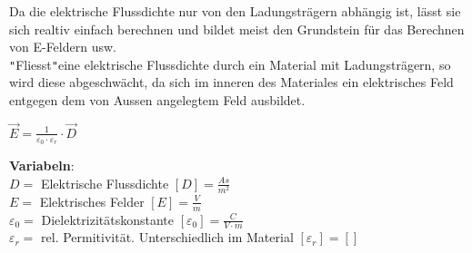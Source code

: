 Da die elektrische Flussdichte nur von den Ladungsträgern abhängig ist, lässt sie sich realtiv einfach berechnen und bildet meist den Grundstein für
das Berechnen von E-Feldern usw. \\
\texttt{"}Fliesst\texttt{"}eine elektrische Flussdichte durch ein Material mit Ladungsträgern, so wird diese abgeschwächt, da sich im inneren des Materiales ein
elektrisches Feld entgegen dem von Aussen angelegtem Feld ausbildet. \\
\begin{center}
\end{center}

\begingl
\begin{center}
	\formulaBegin
	$ \vec{E} = \frac{1}{\varepsilon_0 \cdot \varepsilon_r} \cdot \vec{D}$
	\formulaEnd
\end{center}
\textbf{Variabeln}: \\
$D = $ Elektrische Flussdichte $ [D] = \frac{As}{m^2}$ \\
$ E = $ Elektrisches Felder $[E] = \frac{V}{m}$ \\
$ \varepsilon_0 = $ Dielektrizitätskonstante $ [\varepsilon_0] = \frac{C}{V\cdot m}$ \\
$ \varepsilon_r = $ rel. Permitivität. Unterschiedlich im Material $ [\varepsilon_r] = [ ]$ \\

\iend



